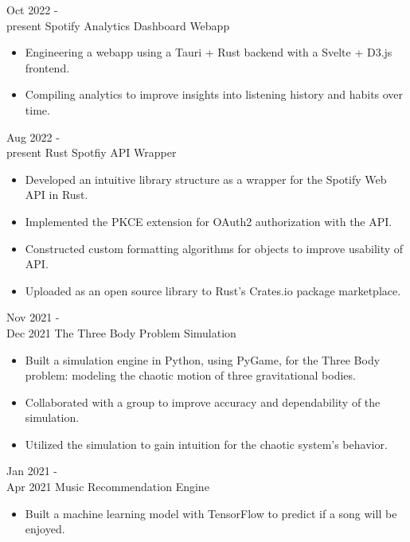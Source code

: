 \documentclass[9pt]{developercv} %
\begin{document}


\begin{entrylist}
	\entry 
		{Oct 2022 -\\present}
		{Spotify Analytics Dashboard Webapp}
		{}
		{\begin{itemize}[noitemsep, topsep=1pt]
			\item Engineering a webapp using a Tauri + Rust backend with a Svelte + D3.js frontend. 
			\item Compiling analytics to improve insights into listening history and habits over time.
		\end{itemize}}
	\entry
		{Aug 2022 -\\present}
		{Rust Spotfiy API Wrapper}
		{}
		{\begin{itemize}[noitemsep, topsep=1pt]
			\item Developed an intuitive library structure as a wrapper for the Spotify Web API in Rust. 
			\item Implemented the PKCE extension for OAuth2 authorization with the API. 
			\item Constructed custom formatting algorithms for objects to improve usability of API.
			\item Uploaded as an open source library to Rust's Crates.io package marketplace.
		\end{itemize}}
	\entry
		{Nov 2021 -\\Dec 2021}
		{The Three Body Problem Simulation}
		{}
		{\begin{itemize}[noitemsep, topsep=1pt]
			\item Built a simulation engine in Python, using PyGame, for the Three Body problem: modeling the chaotic motion of three gravitational bodies. 
			\item Collaborated with a group to improve accuracy and dependability of the simulation.
			\item Utilized the simulation to gain intuition for the chaotic system's behavior.
		\end{itemize}}
	\entry
		{Jan 2021 -\\Apr 2021}
		{Music Recommendation Engine}
		{}
		{\begin{itemize}[noitemsep, topsep=1pt]
			\item Built a machine learning model with TensorFlow to predict if a song will be enjoyed.

\end{itemize}}
\end{entrylist}
\end{document}
